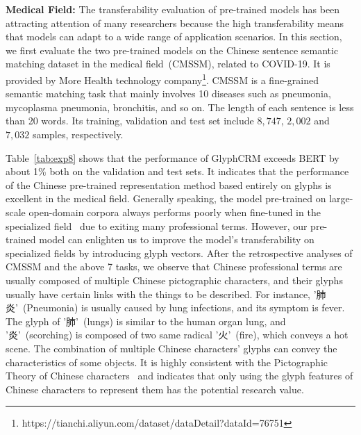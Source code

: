 \textbf{Medical Field:} The transferability evaluation of pre-trained models has been attracting attention of many researchers because the high transferability means that models can adapt to a wide range of application scenarios. In this section, we first evaluate the two pre-trained models on the Chinese sentence semantic matching dataset in the medical field~(CMSSM), related to COVID-19. It is provided by More Health technology company\footnote{https://tianchi.aliyun.com/dataset/dataDetail?dataId=76751}. CMSSM is a fine-grained semantic matching task that mainly involves 10 diseases such as pneumonia, mycoplasma pneumonia, bronchitis, and so on. The length of each sentence is less than 20 words. Its training, validation and test set include $8,747$, $2,002$ and $7,032$ samples, respectively. 

\begin{CJK}{UTF8}{gbsn}
Table~\ref{tab:exp8} shows that the performance of GlyphCRM exceeds BERT by about 1\% both on the validation and test sets. It indicates that the performance of the Chinese pre-trained representation method based entirely on glyphs is excellent in the medical field. Generally speaking, the model pre-trained on large-scale open-domain corpora always performs poorly when fine-tuned in the specialized field~\cite{dont_stop_pretrain} due to exiting many professional terms. However, our pre-trained model can enlighten us to improve the model's transferability on specialized fields by introducing glyph vectors. After the retrospective analyses of CMSSM and the above 7 tasks, we observe that Chinese professional terms are usually composed of multiple Chinese pictographic characters, and their glyphs usually have certain links with the things to be described. For instance, '肺炎'~(Pneumonia) is usually caused by lung infections, and its symptom is fever. The glyph of '肺'~(lungs) is similar to the human organ lung, and '炎'~(scorching) is composed of two same radical '火'~(fire), which conveys a hot scene. The combination of multiple Chinese characters' glyphs can convey the characteristics of some objects. It is highly consistent with the Pictographic Theory of Chinese characters~\cite{chinese_word} and indicates that only using the glyph features of Chinese characters to represent them has the potential research value. 
\end{CJK}

